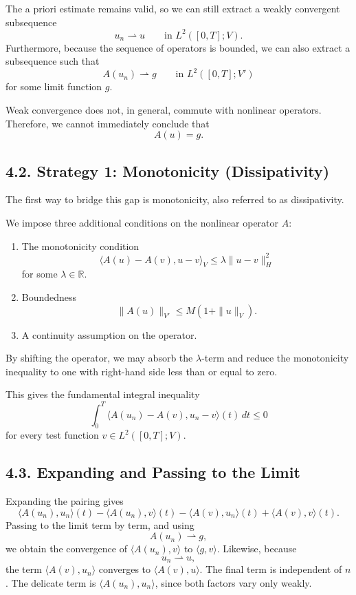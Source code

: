\documentclass[11pt]{article}
\theoremstyle{definition}
\theoremstyle{remark}
\begin{document}
The a priori estimate remains valid, so we can still extract a weakly convergent subsequence
\[
u_n\rightharpoonup u
\qquad
\text{in } L^2([0,T];V).
\]
Furthermore, because the sequence of operators is bounded, we can also extract a subsequence such that
\[
A(u_n)\rightharpoonup g
\qquad
\text{in } L^2([0,T];V')
\]
for some limit function \(g\).

Weak convergence does not, in general, commute with nonlinear operators. Therefore, we cannot immediately conclude that
\[
A(u)=g.
\]

\subsection*{4.2. Strategy 1: Monotonicity (Dissipativity)}
The first way to bridge this gap is monotonicity, also referred to as dissipativity.

We impose three additional conditions on the nonlinear operator \(A\):

\begin{enumerate}
\item The monotonicity condition
\[
\langle A(u)-A(v),u-v\rangle_V\le \lambda\|u-v\|_H^2
\]
for some \(\lambda\in\mathbb R\).
\item Boundedness
\[
\|A(u)\|_{V'}\le M(1+\|u\|_V).
\]
\item A continuity assumption on the operator.
\end{enumerate}

By shifting the operator, we may absorb the \(\lambda\)-term and reduce the monotonicity inequality to one with right-hand side less than or equal to zero.

This gives the fundamental integral inequality
\[
\int_0^T \langle A(u_n)-A(v),u_n-v\rangle(t)\,dt\le 0
\]
for every test function \(v\in L^2([0,T];V)\).

\subsection*{4.3. Expanding and Passing to the Limit}
Expanding the pairing gives
\[
\langle A(u_n),u_n\rangle(t)-\langle A(u_n),v\rangle(t)-\langle A(v),u_n\rangle(t)+\langle A(v),v\rangle(t).
\]
Passing to the limit term by term, and using
\[
A(u_n)\rightharpoonup g,
\]
we obtain the convergence of \(\langle A(u_n),v\rangle\) to \(\langle g,v\rangle\). Likewise, because
\[
u_n\rightharpoonup u,
\]
the term \(\langle A(v),u_n\rangle\) converges to \(\langle A(v),u\rangle\). The final term is independent of \(n\). The delicate term is \(\langle A(u_n),u_n\rangle\), since both factors vary only weakly.
\end{document}
